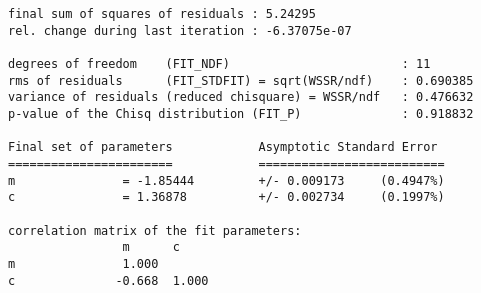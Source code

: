     \begin{verbatim}
final sum of squares of residuals : 5.24295
rel. change during last iteration : -6.37075e-07

degrees of freedom    (FIT_NDF)                        : 11
rms of residuals      (FIT_STDFIT) = sqrt(WSSR/ndf)    : 0.690385
variance of residuals (reduced chisquare) = WSSR/ndf   : 0.476632
p-value of the Chisq distribution (FIT_P)              : 0.918832

Final set of parameters            Asymptotic Standard Error
=======================            ==========================
m               = -1.85444         +/- 0.009173     (0.4947%)
c               = 1.36878          +/- 0.002734     (0.1997%)

correlation matrix of the fit parameters:
                m      c      
m               1.000 
c              -0.668  1.000
    \end{verbatim}